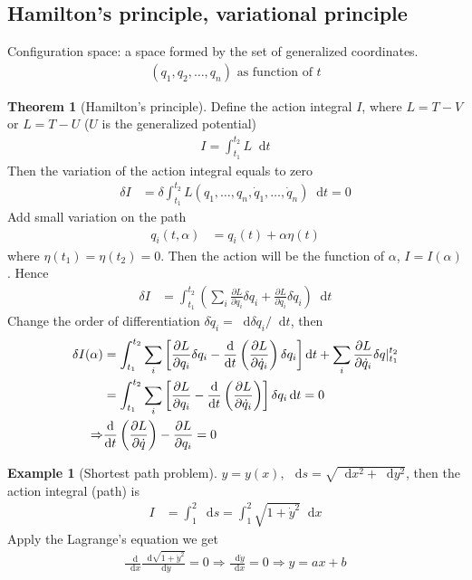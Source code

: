 \documentclass[twoside,9pt]{article}
\numberwithin{equation}{section} %
\newcommand{\lms}{\fontfamily{lmss}\selectfont} %
\renewcommand*\d{\mathop{}\!\mathrm{d}}
\theoremstyle{definition}
\newtheorem{theorem}{\lms Theorem}[section]
\newtheorem{example}{\lms Example}[section]
\theoremstyle{remark}
\begin{document}
\subsection{Hamilton's principle, variational principle}
Configuration space: a space formed by the set of generalized coordinates.
\begin{align}
    (q_1, q_2, \dots, q_n)\text{ as function of $t$}
\end{align}
\begin{theorem}[Hamilton's principle]
Define the action integral $I$, where $L=T-V$ or $L=T-U$ ($U$ is the generalized
potential)
\begin{align}
    I =  \int_{t_1}^{t_2}L\d t
\end{align}
Then the variation of the action integral equals to zero
\begin{align}
    \delta I &= 
    \delta \int_{t_1}^{t_2}L(q_1,\dots, q_n,\dot{q}_1,\dots,\dot{q}_n)\d t
    = 0
\end{align}
Add small variation on the path
\begin{align}
    q_i(t, \alpha) &= q_i(t) + \alpha\eta(t)
\end{align}
where $\eta(t_1)=\eta(t_2)=0$.
Then the action will be the function of $\alpha$, $I=I(\alpha)$.
Hence
\begin{align}
    \delta I &= 
    \int_{t_1}^{t_2}\left(\sum_i \frac{\partial L}{\partial q_i}\delta q_i
    + \frac{\partial L}{\partial \dot{q}_i}\delta\dot{q}_i\right)\d t
\end{align}
Change the order of differentiation $\delta\dot{q}_i = \d \delta q_i/\d t$, then
\begin{align}
    \delta I(\alpha) &= 
    \int_{t_1}^{t_2}\sum_i\left[
        \frac{\partial L}{\partial q_i}\delta q_i
        - \frac{\d}{\d t}\left(\frac{\partial L}{\partial\dot{q}_i}\right)\delta q_i
        \right]\d t
        + \sum_i\frac{\partial L}{\partial\dot{q}_i}\delta q\large|_{t_1}^{t_2}\\
    &= 
    \int_{t_1}^{t_2}\sum_i\left[
        \frac{\partial L}{\partial q_i}
        - \frac{\d}{\d t}\left(\frac{\partial L}{\partial\dot{q}_i}\right)
    \right]\delta q_i\d t = 0 \\
    \Rightarrow
    & \frac{\d}{\d t}\left(\frac{\partial L}{\partial\dot{q}}\right)
    - \frac{\partial L}{\partial q_i} = 0
\end{align}
\end{theorem}

\begin{example}[Shortest path problem]
$y=y(x)$, $\d s = \sqrt{\d x^2 + \d y^2}$, then the action integral (path) is
\begin{align}
    I &= \int_1^2\d s = 
    \int_1^2\sqrt{1+\dot{y}^2}\d x
\end{align}
Apply the Lagrange's equation we get
\begin{align}
    \frac{\d }{\d x}\frac{\d \sqrt{1+\dot{y}^2}}{\d \dot{y}} = 0
    \Rightarrow \frac{\d\dot{y}}{\d x} = 0
    \Rightarrow y = ax + b
\end{align}
\end{example}
\end{document}
